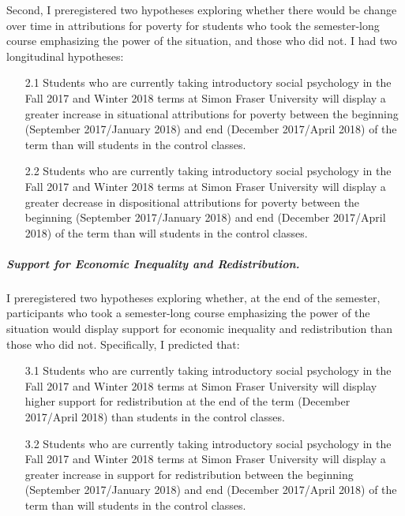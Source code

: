 \documentclass{sfuthesis}
\begin{document}
\begin{flushleft}
Second, I preregistered two hypotheses exploring whether there would be change over time in attributions for poverty for students who took the semester-long course emphasizing the power of the situation, and those who did not. I had two longitudinal hypotheses:
\end{flushleft}

\begin{itemize}
  \item [2.1]	Students who are currently taking introductory social psychology in the Fall 2017 and Winter 2018 terms at Simon Fraser University will display a greater increase in situational attributions for poverty between the beginning (September 2017/January 2018) and end (December 2017/April 2018) of the term than will students in the control classes.
  \item [2.2]	Students who are currently taking introductory social psychology in the Fall 2017 and Winter 2018 terms at Simon Fraser University will display a greater decrease in dispositional attributions for poverty between the beginning (September 2017/January 2018) and end (December 2017/April 2018) of the term than will students in the control classes.
\end{itemize}

\subparagraph{Support for Economic Inequality and Redistribution.} I preregistered two hypotheses exploring whether, at the end of the semester, participants who took a semester-long course emphasizing the power of the situation would display support for economic inequality and redistribution than those who did not. Specifically, I predicted that:

\begin{itemize}
  \item [3.1]	Students who are currently taking introductory social psychology in the Fall 2017 and Winter 2018 terms at Simon Fraser University will display higher support for redistribution at the end of the term (December 2017/April 2018) than students in the control classes.
\item [3.2]	Students who are currently taking introductory social psychology in the Fall 2017 and Winter 2018 terms at Simon Fraser University will display a greater increase in support for redistribution between the beginning (September 2017/January 2018) and end (December 2017/April 2018) of the term than will students in the control classes.
\end{itemize}
\end{document}
